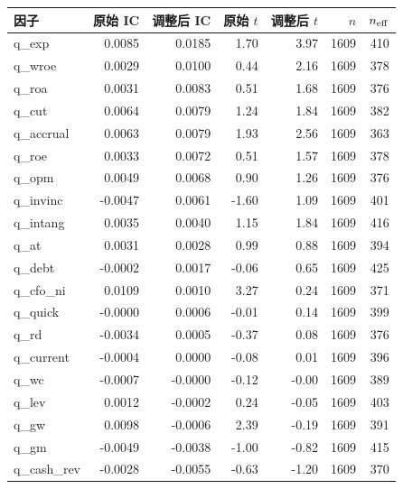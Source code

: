 {\small
\begin{longtable}{@{}lrrrrrr@{}}
\toprule
因子 & 原始 IC & 调整后 IC & 原始 $t$ & 调整后 $t$ & $n$ & $n_{\rm eff}$ \\
\midrule
\endhead
q\_exp & 0.0085 & 0.0185 & 1.70 & 3.97 & 1609 & 410 \\
q\_wroe & 0.0029 & 0.0100 & 0.44 & 2.16 & 1609 & 378 \\
q\_roa & 0.0031 & 0.0083 & 0.51 & 1.68 & 1609 & 376 \\
q\_cut & 0.0064 & 0.0079 & 1.24 & 1.84 & 1609 & 382 \\
q\_accrual & 0.0063 & 0.0079 & 1.93 & 2.56 & 1609 & 363 \\
q\_roe & 0.0033 & 0.0072 & 0.51 & 1.57 & 1609 & 378 \\
q\_opm & 0.0049 & 0.0068 & 0.90 & 1.26 & 1609 & 376 \\
q\_invinc & -0.0047 & 0.0061 & -1.60 & 1.09 & 1609 & 401 \\
q\_intang & 0.0035 & 0.0040 & 1.15 & 1.84 & 1609 & 416 \\
q\_at & 0.0031 & 0.0028 & 0.99 & 0.88 & 1609 & 394 \\
q\_debt & -0.0002 & 0.0017 & -0.06 & 0.65 & 1609 & 425 \\
q\_cfo\_ni & 0.0109 & 0.0010 & 3.27 & 0.24 & 1609 & 371 \\
q\_quick & -0.0000 & 0.0006 & -0.01 & 0.14 & 1609 & 399 \\
q\_rd & -0.0034 & 0.0005 & -0.37 & 0.08 & 1609 & 376 \\
q\_current & -0.0004 & 0.0000 & -0.08 & 0.01 & 1609 & 396 \\
q\_wc & -0.0007 & -0.0000 & -0.12 & -0.00 & 1609 & 389 \\
q\_lev & 0.0012 & -0.0002 & 0.24 & -0.05 & 1609 & 403 \\
q\_gw & 0.0098 & -0.0006 & 2.39 & -0.19 & 1609 & 391 \\
q\_gm & -0.0049 & -0.0038 & -1.00 & -0.82 & 1609 & 415 \\
q\_cash\_rev & -0.0028 & -0.0055 & -0.63 & -1.20 & 1609 & 370 \\
\bottomrule
\end{longtable}
}
